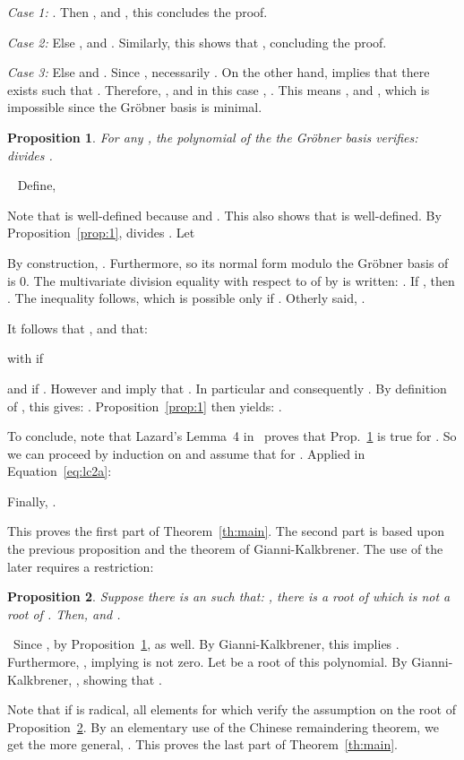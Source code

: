 \documentclass[a4paper,11pt]{article}
\newcommand{\proof}{\noindent {\sc Proof:}~}
\newcommand{\foorp}{\hfill }
\newtheorem{Prop}{Proposition}
\begin{document}
{\em Case 1:} .
Then , and ,
this concludes the proof. 
\smallskip

{\em Case 2:} Else ,
and . Similarly,
this shows that ,
concluding the proof.
\smallskip

{\em Case 3:} Else 
and .
Since ,
necessarily .
On the other hand, 
implies that there exists 
such that .
Therefore,
,
and in this case ,
.
This means ,
and , which is impossible since 
the Gr\"obner basis is minimal. \foorp


\begin{Prop}\label{prop:2}
For any , the polynomial   of the
 the Gr\"obner basis  verifies:  divides .
\end{Prop}
\proof
Define,

Note that  is well-defined
because  and .
This also shows that  is well-defined.
By Proposition~\ref{prop:1}, 
divides . Let

By construction, . Furthermore, 
so its normal form modulo the Gr\"obner basis
of  is 0. The multivariate division equality
with respect to  of  by 
is written: .
If , then . The inequality  follows, which is possible 
only if .
Otherly said, .

It follows that
,
and that:

with   if 

and
  if .
However 
and 
imply that .
In particular 
and consequently .
By definition of ,
this gives:
.
Proposition~\ref{prop:1} then yields: .


To conclude, note that Lazard's Lemma~4
in~\cite{Laz85}
proves that Prop.~\ref{prop:2} is true for
. So we can proceed by induction
on  and assume that 
for . Applied in Equation~\eqref{eq:lc2a}:

Finally, .
\foorp
\medskip

This proves the first part of Theorem~\ref{th:main}.
The second part is based upon the previous proposition and the theorem
of Gianni-Kalkbrener.
The use of the later requires a restriction:
\begin{Prop}\label{prop:3}
Suppose there is an 
such that: ,
there is a root   of 
which is not a root of .
Then, 
and .
\end{Prop}
\proof Since , by Proposition~\ref{prop:2},
 as well. By Gianni-Kalkbrener,
this implies .
Furthermore,  ,
implying  is not zero. 
Let  be a root of this polynomial.
By Gianni-Kalkbrener, ,
showing that .
\foorp
\medskip

Note that if  is radical, all elements 
for which  verify the assumption
on the root 
of  Proposition~\ref{prop:3}. By an elementary use
of the Chinese remaindering theorem, we get the more general,
.
This proves the last part of Theorem~\ref{th:main}.
\end{document}
